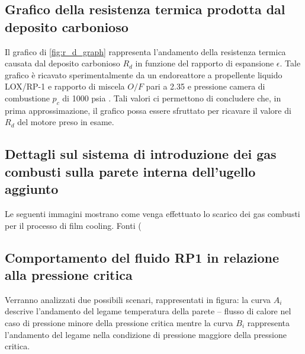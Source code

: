 \subsection{Grafico della resistenza termica prodotta dal deposito carbonioso}
Il grafico di \autoref{fig:r_d_graph} rappresenta l'andamento della resistenza termica causata dal deposito carbonioso $R_d$ in funzione del rapporto di espansione $\epsilon$. Tale grafico è ricavato sperimentalmente da un endoreattore a propellente liquido LOX/RP-1 e rapporto di miscela $O/F$ pari a 2.35 e pressione camera di combustione $p_c$ di 1000 psia \cite{AIAA_book_2}. Tali valori ci permettono di concludere che, in prima approssimazione, il grafico possa essere sfruttato per ricavare il valore di $R_d$ del motore preso in esame. 


\subsection{Dettagli sul sistema di introduzione dei gas combusti sulla parete interna dell'ugello aggiunto}
Le seguenti immagini mostrano come venga effettuato lo scarico dei gas combusti per il processo di film cooling. Fonti (\cite{site_exhaust} \cite{f-1_manual}

\subsection{Comportamento del fluido RP1 in relazione alla pressione critica}

 
Verranno analizzati due possibili scenari, rappresentati in figura: la curva $A_i$ descrive l'andamento del legame temperatura della parete – flusso di calore nel caso di pressione minore della pressione critica mentre la curva $B_i$ rappresenta l'andamento del legame nella condizione di pressione maggiore della pressione critica.

